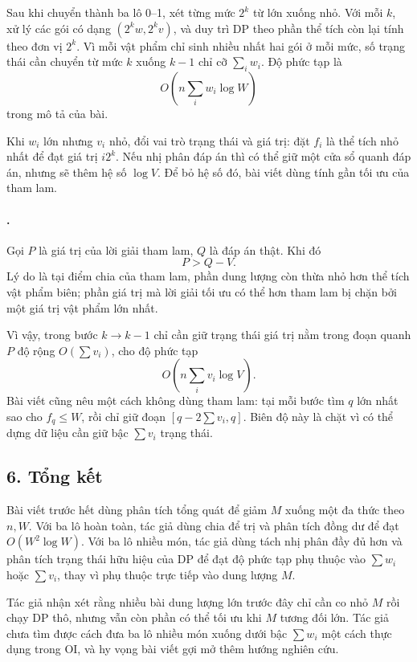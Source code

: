 \documentclass[11pt]{article}
\begin{document}
Sau khi chuyển thành ba lô 0--1, xét từng mức \(2^k\) từ lớn xuống nhỏ. Với
mỗi \(k\), xử lý các gói có dạng \((2^kw,2^kv)\), và duy trì DP theo phần thể
tích còn lại tính theo đơn vị \(2^k\). Vì mỗi vật phẩm chỉ sinh nhiều nhất hai
gói ở mỗi mức, số trạng thái cần chuyển từ mức \(k\) xuống \(k-1\) chỉ cỡ
\(\sum_i w_i\). Độ phức tạp là
\[
  O\left(n\sum_i w_i\log W\right)
\]
trong mô tả của bài.

Khi \(w_i\) lớn nhưng \(v_i\) nhỏ, đổi vai trò trạng thái và giá trị: đặt
\(f_i\) là thể tích nhỏ nhất để đạt giá trị \(i2^k\). Nếu nhị phân đáp án thì
có thể giữ một cửa sổ quanh đáp án, nhưng sẽ thêm hệ số \(\log V\). Để bỏ hệ
số đó, bài viết dùng tính gần tối ưu của tham lam.

\paragraph{.}
Gọi \(P\) là giá trị của lời giải tham lam, \(Q\) là đáp án thật. Khi đó
\[
  P>Q-V.
\]
Lý do là tại điểm chia của tham lam, phần dung lượng còn thừa nhỏ hơn thể tích
vật phẩm biên; phần giá trị mà lời giải tối ưu có thể hơn tham lam bị chặn
bởi một giá trị vật phẩm lớn nhất.

Vì vậy, trong bước \(k\to k-1\) chỉ cần giữ trạng thái giá trị nằm trong đoạn
quanh \(P\) độ rộng \(O(\sum v_i)\), cho độ phức tạp
\[
  O\left(n\sum_i v_i\log V\right).
\]
Bài viết cũng nêu một cách không dùng tham lam: tại mỗi bước tìm \(q\) lớn
nhất sao cho \(f_q\le W\), rồi chỉ giữ đoạn \([q-2\sum v_i,q]\). Biên độ này
là chặt vì có thể dựng dữ liệu cần giữ bậc \(\sum v_i\) trạng thái.

\subsection*{6. Tổng kết}

Bài viết trước hết dùng phân tích tổng quát để giảm \(M\) xuống một đa thức
theo \(n,W\). Với ba lô hoàn toàn, tác giả dùng chia để trị và phân tích đồng
dư để đạt \(O(W^2\log W)\). Với ba lô nhiều món, tác giả dùng tách nhị phân
đầy đủ hơn và phân tích trạng thái hữu hiệu của DP để đạt độ phức tạp phụ
thuộc vào \(\sum w_i\) hoặc \(\sum v_i\), thay vì phụ thuộc trực tiếp vào
dung lượng \(M\).

Tác giả nhận xét rằng nhiều bài dung lượng lớn trước đây chỉ cần co nhỏ \(M\)
rồi chạy DP thô, nhưng vẫn còn phần có thể tối ưu khi \(M\) tương đối lớn.
Tác giả chưa tìm được cách đưa ba lô nhiều món xuống dưới bậc \(\sum w_i\) một
cách thực dụng trong OI, và hy vọng bài viết gợi mở thêm hướng nghiên cứu.
\end{document}
